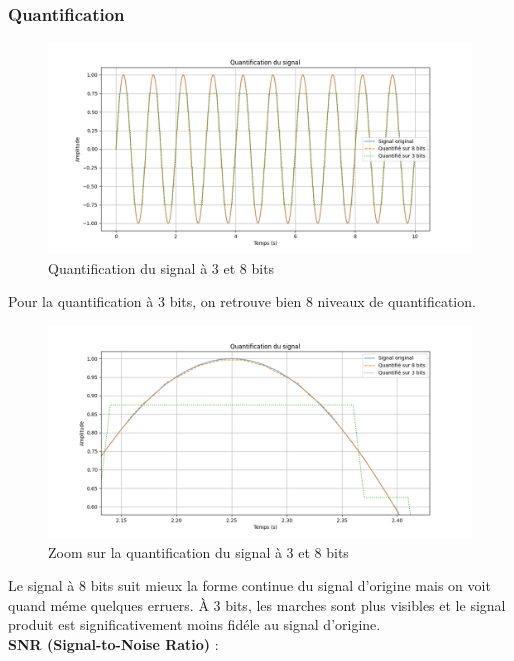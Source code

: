 \subsubsection{Quantification}

\begin{figure}[!h]
\centering
\includegraphics[width=15.5cm]{screenshots/quantification_graph.png}
\caption{Quantification du signal à 3 et 8 bits}
\end{figure}

Pour la quantification à 3 bits, on retrouve bien 8 niveaux de quantification.

\begin{figure}[!h]
\centering
\includegraphics[width=17cm]{screenshots/quantification_graph_zoomed.png}
\caption{Zoom sur la quantification du signal à 3 et 8 bits}
\end{figure}

Le signal à 8 bits suit mieux la forme continue du signal d’origine mais on voit quand méme quelques erruers. À 3 bits, les marches sont plus visibles et le signal produit est significativement moins fidéle au signal d'origine.\\

\textbf{SNR (Signal-to-Noise Ratio)} :

